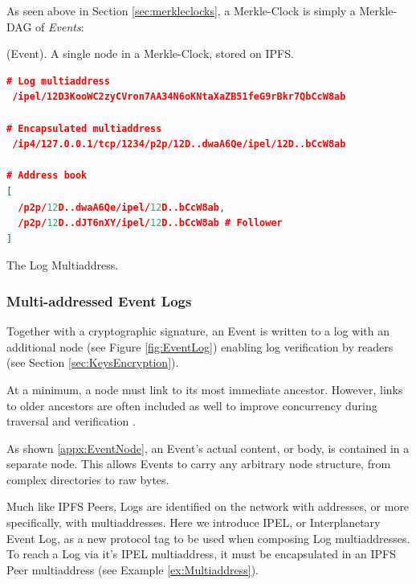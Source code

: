 \documentclass{textile}
\begin{document}
As seen above in Section \ref{sec:merkleclocks}, a Merkle-Clock is simply a Merkle-DAG of \emph{Events}:

\begin{definition}
 (Event). A single node in a Merkle-Clock, stored on IPFS.
\end{definition}

\FloatBarrier

\begin{example*}[!b]
\centering
\begin{minipage}{0.7\textwidth}
\begin{lstlisting}[language=json,firstnumber=1]
# Log multiaddress
 /ipel/12D3KooWC2zyCVron7AA34N6oKNtaXaZB51feG9rBkr7QbCcW8ab

# Encapsulated multiaddress
 /ip4/127.0.0.1/tcp/1234/p2p/12D..dwaA6Qe/ipel/12D..bCcW8ab

# Address book
[
  /p2p/12D..dwaA6Qe/ipel/12D..bCcW8ab,
  /p2p/12D..dJT6nXY/ipel/12D..bCcW8ab # Follower
]
\end{lstlisting}
\end{minipage}
  \caption{The Log Multiaddress.}
  \label{ex:Multiaddress}
\end{example*}

\subsubsection{Multi-addressed Event Logs}

Together with a cryptographic signature, an Event is written to a log with an additional node (see Figure \ref{fig:EventLog}) enabling log verification by readers (see Section \ref{sec:KeysEncryption}).

At a minimum, a node must link to its most immediate ancestor. However, links to older ancestors are often included as well to improve concurrency during traversal and verification \cite{meyerBamboo2019}.

As shown \ref{appx:EventNode}, an Event's actual content, or body, is contained in a separate node. This allows Events to carry any arbitrary node structure, from complex directories to raw bytes.

Much like IPFS Peers, Logs are identified on the network with addresses, or more specifically, with multiaddresses\cite{multiformatsMultiaddr}. Here we introduce IPEL, or Interplanetary Event Log, as a new protocol tag to be used when composing Log multiaddresses. To reach a Log via it's IPEL multiaddress, it must be encapsulated in an IPFS Peer multiaddress (see Example \ref{ex:Multiaddress}).
\end{document}
